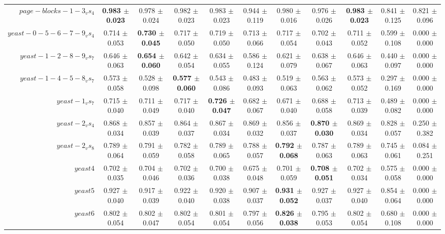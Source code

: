 \begin{table}[!ht]
{\begin{tabular}{r c c c c c c c c c c}
$page-blocks-1-3_vs_4$ & \textbf{0.983 $\pm$ 0.023} & 0.978 $\pm$ 0.024 & 0.982 $\pm$ 0.023 & 0.983 $\pm$ 0.023 & 0.944 $\pm$ 0.119 & 0.980 $\pm$ 0.016 & 0.976 $\pm$ 0.026 & \textbf{0.983 $\pm$ 0.023} & 0.841 $\pm$ 0.125 & 0.821 $\pm$ 0.096 \\
$yeast-0-5-6-7-9_vs_4$ & 0.714 $\pm$ 0.053 & \textbf{0.730 $\pm$ 0.045} & 0.717 $\pm$ 0.050 & 0.719 $\pm$ 0.050 & 0.713 $\pm$ 0.066 & 0.717 $\pm$ 0.054 & 0.702 $\pm$ 0.043 & 0.711 $\pm$ 0.052 & 0.599 $\pm$ 0.108 & 0.000 $\pm$ 0.000 \\
$yeast-1-2-8-9_vs_7$ & 0.646 $\pm$ 0.063 & \textbf{0.654 $\pm$ 0.060} & 0.642 $\pm$ 0.054 & 0.634 $\pm$ 0.055 & 0.586 $\pm$ 0.124 & 0.621 $\pm$ 0.079 & 0.638 $\pm$ 0.067 & 0.646 $\pm$ 0.063 & 0.440 $\pm$ 0.097 & 0.000 $\pm$ 0.000 \\
$yeast-1-4-5-8_vs_7$ & 0.573 $\pm$ 0.058 & 0.528 $\pm$ 0.098 & \textbf{0.577 $\pm$ 0.060} & 0.543 $\pm$ 0.086 & 0.483 $\pm$ 0.093 & 0.519 $\pm$ 0.063 & 0.563 $\pm$ 0.062 & 0.573 $\pm$ 0.052 & 0.297 $\pm$ 0.169 & 0.000 $\pm$ 0.000 \\
$yeast-1_vs_7$ & 0.715 $\pm$ 0.040 & 0.711 $\pm$ 0.049 & 0.717 $\pm$ 0.040 & \textbf{0.726 $\pm$ 0.047} & 0.682 $\pm$ 0.067 & 0.671 $\pm$ 0.040 & 0.688 $\pm$ 0.058 & 0.713 $\pm$ 0.039 & 0.489 $\pm$ 0.082 & 0.000 $\pm$ 0.000 \\
$yeast-2_vs_4$ & 0.868 $\pm$ 0.034 & 0.857 $\pm$ 0.039 & 0.864 $\pm$ 0.037 & 0.867 $\pm$ 0.034 & 0.869 $\pm$ 0.032 & 0.856 $\pm$ 0.037 & \textbf{0.870 $\pm$ 0.030} & 0.869 $\pm$ 0.034 & 0.828 $\pm$ 0.057 & 0.250 $\pm$ 0.382 \\
$yeast-2_vs_8$ & 0.789 $\pm$ 0.064 & 0.791 $\pm$ 0.059 & 0.782 $\pm$ 0.058 & 0.789 $\pm$ 0.065 & 0.788 $\pm$ 0.057 & \textbf{0.792 $\pm$ 0.068} & 0.787 $\pm$ 0.063 & 0.789 $\pm$ 0.063 & 0.745 $\pm$ 0.061 & 0.084 $\pm$ 0.251 \\
$yeast4$ & 0.702 $\pm$ 0.035 & 0.704 $\pm$ 0.046 & 0.702 $\pm$ 0.036 & 0.700 $\pm$ 0.038 & 0.675 $\pm$ 0.048 & 0.701 $\pm$ 0.059 & \textbf{0.708 $\pm$ 0.051} & 0.702 $\pm$ 0.034 & 0.575 $\pm$ 0.058 & 0.000 $\pm$ 0.000 \\
$yeast5$ & 0.927 $\pm$ 0.040 & 0.917 $\pm$ 0.039 & 0.922 $\pm$ 0.040 & 0.920 $\pm$ 0.038 & 0.907 $\pm$ 0.037 & \textbf{0.931 $\pm$ 0.052} & 0.927 $\pm$ 0.037 & 0.927 $\pm$ 0.040 & 0.854 $\pm$ 0.064 & 0.000 $\pm$ 0.000 \\
$yeast6$ & 0.802 $\pm$ 0.054 & 0.802 $\pm$ 0.047 & 0.802 $\pm$ 0.054 & 0.801 $\pm$ 0.054 & 0.797 $\pm$ 0.056 & \textbf{0.826 $\pm$ 0.038} & 0.795 $\pm$ 0.053 & 0.802 $\pm$ 0.054 & 0.680 $\pm$ 0.108 & 0.000 $\pm$ 0.000 \\

\end{tabular}}
\end{table}
